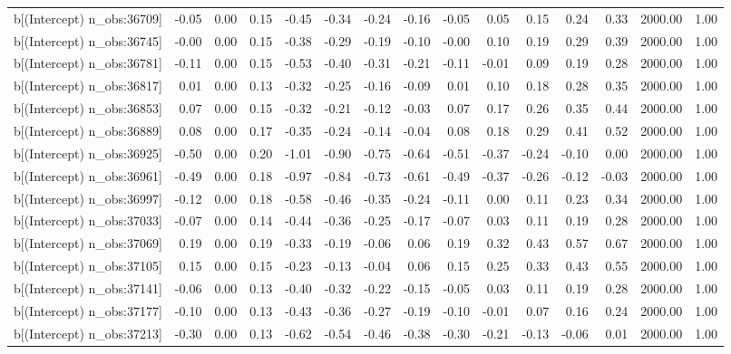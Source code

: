 \begin{table}[ht]
\begin{tabular}{rrrrrrrrrrrrrrr}
  b[(Intercept) n\_obs:36709] & -0.05 & 0.00 & 0.15 & -0.45 & -0.34 & -0.24 & -0.16 & -0.05 & 0.05 & 0.15 & 0.24 & 0.33 & 2000.00 & 1.00 \\ 
  b[(Intercept) n\_obs:36745] & -0.00 & 0.00 & 0.15 & -0.38 & -0.29 & -0.19 & -0.10 & -0.00 & 0.10 & 0.19 & 0.29 & 0.39 & 2000.00 & 1.00 \\ 
  b[(Intercept) n\_obs:36781] & -0.11 & 0.00 & 0.15 & -0.53 & -0.40 & -0.31 & -0.21 & -0.11 & -0.01 & 0.09 & 0.19 & 0.28 & 2000.00 & 1.00 \\ 
  b[(Intercept) n\_obs:36817] & 0.01 & 0.00 & 0.13 & -0.32 & -0.25 & -0.16 & -0.09 & 0.01 & 0.10 & 0.18 & 0.28 & 0.35 & 2000.00 & 1.00 \\ 
  b[(Intercept) n\_obs:36853] & 0.07 & 0.00 & 0.15 & -0.32 & -0.21 & -0.12 & -0.03 & 0.07 & 0.17 & 0.26 & 0.35 & 0.44 & 2000.00 & 1.00 \\ 
  b[(Intercept) n\_obs:36889] & 0.08 & 0.00 & 0.17 & -0.35 & -0.24 & -0.14 & -0.04 & 0.08 & 0.18 & 0.29 & 0.41 & 0.52 & 2000.00 & 1.00 \\ 
  b[(Intercept) n\_obs:36925] & -0.50 & 0.00 & 0.20 & -1.01 & -0.90 & -0.75 & -0.64 & -0.51 & -0.37 & -0.24 & -0.10 & 0.00 & 2000.00 & 1.00 \\ 
  b[(Intercept) n\_obs:36961] & -0.49 & 0.00 & 0.18 & -0.97 & -0.84 & -0.73 & -0.61 & -0.49 & -0.37 & -0.26 & -0.12 & -0.03 & 2000.00 & 1.00 \\ 
  b[(Intercept) n\_obs:36997] & -0.12 & 0.00 & 0.18 & -0.58 & -0.46 & -0.35 & -0.24 & -0.11 & 0.00 & 0.11 & 0.23 & 0.34 & 2000.00 & 1.00 \\ 
  b[(Intercept) n\_obs:37033] & -0.07 & 0.00 & 0.14 & -0.44 & -0.36 & -0.25 & -0.17 & -0.07 & 0.03 & 0.11 & 0.19 & 0.28 & 2000.00 & 1.00 \\ 
  b[(Intercept) n\_obs:37069] & 0.19 & 0.00 & 0.19 & -0.33 & -0.19 & -0.06 & 0.06 & 0.19 & 0.32 & 0.43 & 0.57 & 0.67 & 2000.00 & 1.00 \\ 
  b[(Intercept) n\_obs:37105] & 0.15 & 0.00 & 0.15 & -0.23 & -0.13 & -0.04 & 0.06 & 0.15 & 0.25 & 0.33 & 0.43 & 0.55 & 2000.00 & 1.00 \\ 
  b[(Intercept) n\_obs:37141] & -0.06 & 0.00 & 0.13 & -0.40 & -0.32 & -0.22 & -0.15 & -0.05 & 0.03 & 0.11 & 0.19 & 0.28 & 2000.00 & 1.00 \\ 
  b[(Intercept) n\_obs:37177] & -0.10 & 0.00 & 0.13 & -0.43 & -0.36 & -0.27 & -0.19 & -0.10 & -0.01 & 0.07 & 0.16 & 0.24 & 2000.00 & 1.00 \\ 
  b[(Intercept) n\_obs:37213] & -0.30 & 0.00 & 0.13 & -0.62 & -0.54 & -0.46 & -0.38 & -0.30 & -0.21 & -0.13 & -0.06 & 0.01 & 2000.00 & 1.00 \\ 

\end{tabular}
\end{table}

